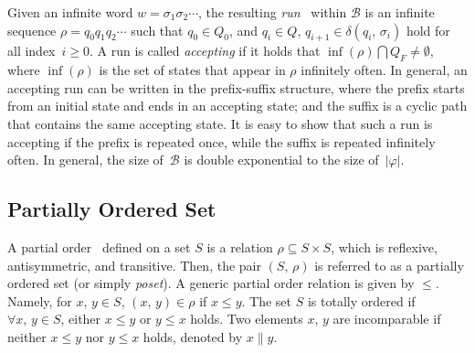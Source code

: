Given an infinite word $w=\sigma_1\sigma_2\cdots$, the resulting \emph{run}~\cite{baier2008principles} within $\mathcal{B}$
is an infinite sequence $\rho=q_0q_1q_2\cdots$
such that $q_0\in Q_0$, and $q_i\in Q$, $q_{i+1}\in\delta(q_i,\,\sigma_i)$ hold for all index~$i\geq 0$.
A run is called \emph{accepting} if it holds that
$\inf(\rho)\bigcap {Q}_F \neq \emptyset$,
where $\inf(\rho)$ is the set of states that appear in $\rho$ infinitely often.
In general, an accepting run can be written in the prefix-suffix structure,
where the prefix starts from an initial state and ends in an accepting state;
and the suffix is a cyclic path that contains the same accepting state.
It is easy to show that such a run is accepting if the prefix is repeated once,
while the suffix is repeated infinitely often.
In general, the size of~$\mathcal{B}$ is double exponential to the size of~$|\varphi|$.

\subsection{Partially Ordered Set}\label{subsec:partial}
A partial order~\cite{simovici2008mathematical} defined on a set $S$ is a relation $\rho\subseteq S\times S$,
which is reflexive, antisymmetric, and transitive.
Then, the pair $(S,\, \rho)$ is referred to as a partially ordered set (or simply \emph{poset}).
A generic partial order relation is given by $\leq$.
Namely, for $x,\,y\in S$, $(x,\,y)\in \rho$ if $x\leq y$.
The set $S$ is totally ordered if $\forall x,\,y\in S$, either $x\leq y$ or $y\leq x$ holds.
Two elements $x,\,y$ are incomparable if neither $x\leq y$ nor $y\leq x$ holds, denoted by $x\parallel y$.
